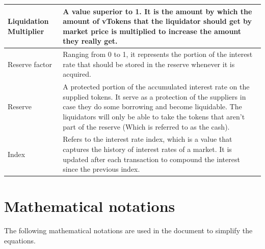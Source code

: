 \begin{tabularx}{\linewidth}{|l|X|}
  Liquidation Multiplier & A value superior to 1. It is the amount by which the amount of vTokens that the liquidator should get by market price is multiplied to increase the amount they really get. \\\hline

  Reserve factor & Ranging from 0 to 1, it represents the portion of the interest rate that should be stored in the reserve whenever it is acquired. \\\hline

  Reserve & A protected portion of the accumulated interest rate on the supplied tokens. It serve as a protection of the suppliers in case they do some borrowing and become liquidable. The liquidators will only be able to take the tokens that aren't part of the reserve (Which is referred to as the cash). \\\hline

  Index & Refers to the interest rate index, which is a value that captures the history of interest rates of a market. It is updated after each transaction to compound the interest since the previous index. \\\hline
\end{tabularx}

\newpage
\section{Mathematical notations}
\label{spec:mn}
The following mathematical notations are used in the document to simplify the equations.

\newcommand\USD{\mathit{USD}}

\newcommand\T[1]{\mathit{T_{#1}}}
\newcommand\vT[1]{\mathit{vT(#1)}}

\newcommand\ER[2]{\mathit{ER(#1, #2)}}

\newcommand\TBA[1]{\mathit{TBA(#1)}}
\newcommand\C[1]{\mathit{C(#1)}}

\newcommand\UR[1]{\mathit{UR(#1)}}
\newcommand\UMul[1]{\mathit{UM(#1)}}
\newcommand\UBR[1]{\mathit{UbR(#1)}}
\newcommand\BIR[1]{\mathit{BIR(#1)}}
\newcommand\RF[1]{\mathit{RF(#1)}}

\newcommand\RTB[1]{\mathit{rTB(#1)}}
\newcommand\VTB[1]{\mathit{vTB(#1)}}
\newcommand\RES[1]{\mathit{Res(#1)}}

\newcommand\CF[1]{\mathit{CF(#1)}}
\newcommand\LMul[1]{\mathit{LMul(#1)}}
\newcommand\AH[1]{\mathit{AH(#1)}}
\newcommand\BC[1]{\mathit{BC(#1)}}

\newcommand\SI[1]{\mathit{SI(#1)}}
\newcommand\BI[1]{\mathit{BI(#1)}}

